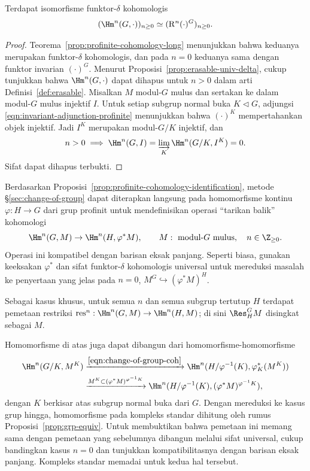 \begin{proposition}\label{prop:profinite-cohomology-identification}
	Terdapat isomorfisme funktor-$\delta$ kohomologis
	\[ (\Hm^n(G,\cdot))_{n\geq0}
	\simeq(\mathrm{R}^n(\cdot)^G)_{n\geq0}. \]
\end{proposition}
\begin{proof}
	Teorema~\ref{prop:profinite-cohomology-long} menunjukkan bahwa keduanya
	merupakan funktor-$\delta$ kohomologis, dan pada $n=0$ keduanya sama dengan
	funktor invarian $(\cdot)^G$. Menurut
	Proposisi~\ref{prop:erasable-univ-delta}, cukup tunjukkan bahwa
	$\Hm^n(G,\cdot)$ dapat dihapus untuk $n>0$ dalam arti
	Definisi~\ref{def:erasable}. Misalkan $M$ modul-$G$ mulus dan sertakan ke
	dalam modul-$G$ mulus injektif $I$. Untuk setiap subgrup normal buka
	$K\lhd G$, adjungsi \eqref{eqn:invariant-adjunction-profinite} menunjukkan
	bahwa $(\cdot)^K$ mempertahankan objek injektif. Jadi $I^K$ merupakan
	modul-$G/K$ injektif, dan
	\[ n>0\implies\Hm^n(G,I)
	=\varinjlim_K\Hm^n(G/K,I^K)=0. \]
	Sifat dapat dihapus terbukti.
\end{proof}

Berdasarkan Proposisi~\ref{prop:profinite-cohomology-identification}, metode
\S\ref{sec:change-of-group} dapat diterapkan langsung pada homomorfisme
kontinu $\varphi:H\to G$ dari grup profinit untuk mendefinisikan operasi
``tarikan balik'' kohomologi
\[ \Hm^n(G,M)\to\Hm^n(H,\varphi^*M),\qquad
	M:\text{ modul-$G$ mulus},\quad n\in\Z_{\geq0}. \]
Operasi ini kompatibel dengan barisan eksak panjang. Seperti biasa, gunakan
keeksakan $\varphi^*$ dan sifat funktor-$\delta$ kohomologis universal untuk
mereduksi masalah ke penyertaan yang jelas pada $n=0$,
$M^G\hookrightarrow(\varphi^*M)^H$.

Sebagai kasus khusus, untuk semua $n$ dan semua subgrup tertutup $H$ terdapat
pemetaan restriksi
$\mathrm{res}^n:\Hm^n(G,M)\to\Hm^n(H,M)$; di sini
$\Res^G_HM$ disingkat sebagai $M$.

Homomorfisme di atas juga dapat dibangun dari homomorfisme-homomorfisme
\begin{align*}
	\Hm^n(G/K,M^K)&\xrightarrow{\eqref{eqn:change-of-group-coh}}
	\Hm^n(H/\varphi^{-1}(K),\varphi_K^*(M^K))\\
	&\xrightarrow{M^K\subset(\varphi^*M)^{\varphi^{-1}K}}
	\Hm^n(H/\varphi^{-1}(K),(\varphi^*M)^{\varphi^{-1}K}),
\end{align*}
dengan $K$ berkisar atas subgrup normal buka dari $G$. Dengan mereduksi ke
kasus grup hingga, homomorfisme pada kompleks standar dihitung oleh rumus
Proposisi~\ref{prop:grp-equiv}. Untuk membuktikan bahwa pemetaan ini memang
sama dengan pemetaan yang sebelumnya dibangun melalui sifat universal, cukup
bandingkan kasus $n=0$ dan tunjukkan kompatibilitasnya dengan barisan eksak
panjang. Kompleks standar memadai untuk kedua hal tersebut.

